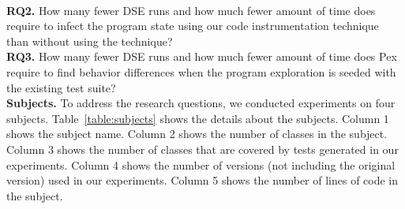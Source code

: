 		\\ \textbf{RQ2.} How many fewer DSE runs and how much fewer amount of time does  require to infect the program state using our code instrumentation technique than without using the technique?
	\\ \textbf{RQ3.} How many fewer DSE runs and how much fewer amount of time does Pex require to find behavior differences when the program exploration is seeded with the existing test suite?
%	
%
%	
%												
%
\\  \textbf{Subjects.} To address the research questions, we conducted experiments on four subjects.
Table~\ref{table:subjects} shows the details about the subjects. Column 1 shows the subject name. Column 2 shows the number of classes in the subject. Column 3 shows the number of classes that are covered by tests generated in our experiments. Column 4 shows the number of versions (not including the original version) used in our experiments. Column 5 shows the number of lines of code in the subject.

